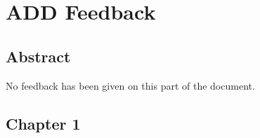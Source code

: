 \chapter{ADD Feedback}
\label{chap:add-feedback}

\section{Abstract}
No feedback has been given on this part of the document.


\section{Chapter 1}

